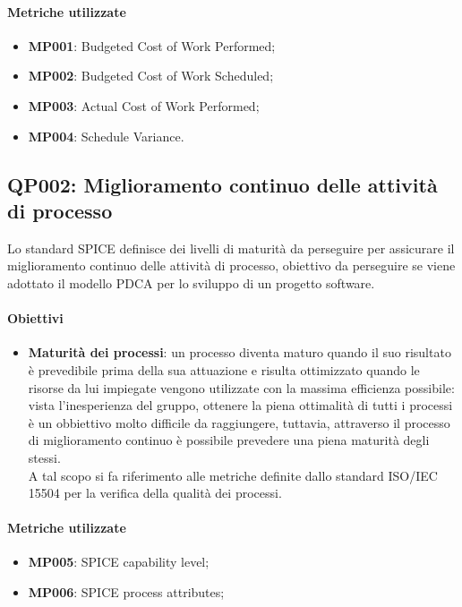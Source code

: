 \paragraph{Metriche utilizzate}
\begin{itemize}
	\item \textbf{MP001}: Budgeted Cost of Work Performed;
	\item \textbf{MP002}: Budgeted Cost of Work Scheduled;
	\item \textbf{MP003}: Actual Cost of Work Performed;
	\item \textbf{MP004}: Schedule Variance.
\end{itemize}


\subsection{QP002: Miglioramento continuo delle attività di processo}
Lo standard SPICE definisce dei livelli di maturità da perseguire per assicurare il miglioramento continuo delle attività di processo, obiettivo da perseguire se viene adottato il modello PDCA per lo sviluppo di un progetto software.
\paragraph{Obiettivi}
\begin{itemize}
	\item \textbf{Maturità dei processi}: un processo diventa maturo quando il suo risultato è prevedibile prima della sua attuazione e risulta ottimizzato quando le risorse da lui impiegate vengono utilizzate con la massima efficienza possibile: vista l'inesperienza del gruppo, ottenere la piena ottimalità di tutti i processi è un obbiettivo molto difficile da raggiungere, tuttavia, attraverso il processo di miglioramento continuo è possibile prevedere una piena maturità degli stessi.\\
	A tal scopo si fa riferimento alle metriche definite dallo standard ISO/IEC 15504 per la verifica della qualità dei processi.
\end{itemize}

\paragraph{Metriche utilizzate}
\begin{itemize}
	\item \textbf{MP005}: SPICE capability level;
	\item \textbf{MP006}: SPICE process attributes;
\end{itemize}

